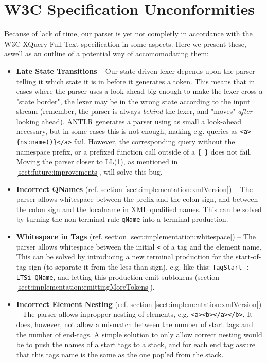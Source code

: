 \section{W3C Specification Unconformities}
\label{sect:future:knownBugs}
Because of lack of time, our parser is yet not completly in accordance with the W3C XQuery Full-Text specification in some aspects. Here we present these, aswell as an outline of a potential way of accomomodating them:

\begin{itemize}
\item \textbf{Late State Transitions} -- Our state driven lexer depends upon the parser telling it which state it is in before it generates a token. This means that in cases where the parser uses a look-ahead big enough to make the lexer cross a "state border", the lexer may be in the wrong state according to the input stream (remember, the parser is always \emph{behind} the lexer, and "moves" \emph{after} looking ahead). ANTLR generates a parser using as small a look-ahead necessary, but in some cases this is not enough, making e.g. queries as \verb!<a>{ns:name()}</a>! fail. However, the corresponding query without the namespace prefix, or a prefixed function call outside of a \verb!{ }! does not fail. Moving the parser closer to LL(1), as mentioned in \ref{sect:future:improvements}, will solve this bug.

\item \textbf{Incorrect QNames} (ref. section \ref{sect:implementation:xmlVersion}) -- The parser allows whitespace between the prefix and the colon sign, and between the colon sign and the localname in XML qualified names. This can be solved by turning the non-terminal rule \verb!qName! into a terminal production.

\item \textbf{Whitespace in Tags} (ref. section \ref{sect:implementation:whitespace}) -- The parser allows whitespace between the initial \verb!<! of a tag and the element name. This can be solved by introducing a new terminal production for the start-of-tag-sign (to separate it from the less-than sign), e.g. like this: \verb!TagStart : LTSi QName!, and letting this production emit subtokens (section \ref{sect:implementation:emittingMoreTokens}).

\item \textbf{Incorrect Element Nesting} (ref. section \ref{sect:implementation:xmlVersion}) -- The parser allows inpropper nesting of elements, e.g. \verb!<a><b></a></b>!. It does, however, not allow a mismatch between the number of start tags and the number of end-tags. A simple solution to only allow correct nesting would be to push the names of a start tags to a stack, and for each end tag assure that this tags name is the same as the one pop'ed from the stack.


\end{itemize}

